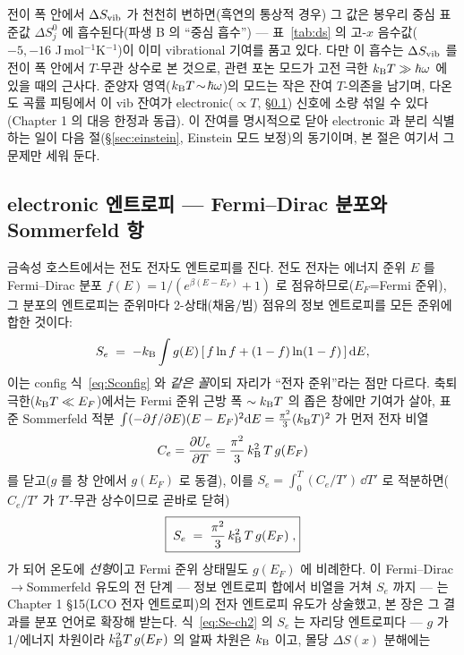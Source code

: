 전이 폭 안에서 $\Delta S_{\mathrm{vib}}$ 가 천천히 변하면(흑연의 통상적 경우) 그 값은 봉우리 중심 표준값 $\Delta S^0_j$
에 흡수된다(파생 B 의 ``중심 흡수'') --- 표~\ref{tab:ds} 의 고-$x$ 음수값($-5,-16$ J\,mol$^{-1}$K$^{-1}$)이
이미 vibrational 기여를 품고 있다. 다만 이 흡수는 $\Delta S_{\mathrm{vib}}$ 를 전이 폭 안에서 $T$-무관 상수로 본 것으로,
관련 포논 모드가 고전 극한 $k_{\mathrm B} T\gg\hbar\omega$ 에 있을 때의 근사다. 준양자 영역($k_{\mathrm B} T\!\sim\!\hbar\omega$)의
모드는 작은 잔여 $T$-의존을 남기며, 다온도 곡률 피팅에서 이 vib 잔여가 electronic($\propto T$,
\S\ref{ssec:elec}) 신호에 소량 섞일 수 있다(Chapter 1 의 대응 한정과 동급). 이 잔여를 명시적으로 닫아
electronic 과 분리 식별하는 일이 다음 절(\S\ref{sec:einstein}, Einstein 모드 보정)의 동기이며, 본 절은 여기서
그 문제만 세워 둔다.

\subsection{electronic 엔트로피 --- Fermi--Dirac 분포와 Sommerfeld 항}\label{ssec:elec}
금속성 호스트에서는 전도 전자도 엔트로피를 진다. 전도 전자는 에너지 준위 $E$ 를 Fermi--Dirac 분포
$f(E)=1/(e^{\beta(E-E_F)}+1)$ 로 점유하므로($E_F$=Fermi 준위), 그 분포의 엔트로피는 준위마다 2-상태(채움/빔)
점유의 정보 엔트로피를 모든 준위에 합한 것이다:
\begin{equation}
S_e \;=\; -k_{\mathrm B}\int g(E)\,[\,f\ln f+(1-f)\ln(1-f)\,]\,\mathrm{d} E,
\label{eq:Se_start}
\end{equation}
이는 config 식~\eqref{eq:Sconfig} 와 \emph{같은 꼴}이되 자리가 ``전자 준위''라는 점만 다르다. 축퇴 극한($k_{\mathrm B}
T\ll E_F$)에서는 Fermi 준위 근방 폭 $\sim k_{\mathrm B} T$ 의 좁은 창에만 기여가 살아, 표준 Sommerfeld 적분
$\int(-\partial f/\partial E)(E-E_F)^2\mathrm{d} E=\tfrac{\pi^2}{3}(k_{\mathrm B} T)^2$ 가 먼저 전자 비열
\[
C_e=\frac{\partial U_e}{\partial T}=\frac{\pi^2}{3}\,k_{\mathrm B}^2\,T\,g(E_F)
\]
를 닫고($g$ 를 창 안에서 $g(E_F)$ 로 동결), 이를 $S_e=\int_0^T (C_e/T')\,\dd T'$ 로 적분하면($C_e/T'$ 가
$T'$-무관 상수이므로 곧바로 닫혀)
\begin{equation}
\boxed{\;S_e \;=\; \frac{\pi^2}{3}\,k_{\mathrm B}^2\,T\,g(E_F)\;,}
\label{eq:Se-ch2}
\end{equation}
가 되어 온도에 \emph{선형}이고 Fermi 준위 상태밀도 $g(E_F)$ 에 비례한다. 이 Fermi--Dirac$\to$Sommerfeld
유도의 전 단계 --- 정보 엔트로피 합에서 비열을 거쳐 $S_e$ 까지 --- 는 Chapter 1 §15(LCO 전자 엔트로피)의 전자
엔트로피 유도가 상술했고, 본 장은 그 결과를 분포 언어로 확장해 받는다. 식~\eqref{eq:Se-ch2} 의 $S_e$ 는 자리당
엔트로피다 --- $g$ 가 1/에너지 차원이라 $k_{\mathrm B}^2 T\,g(E_F)$ 의 알짜 차원은 $k_{\mathrm B}$ 이고, 몰당 $\Delta S(x)$ 분해에는
